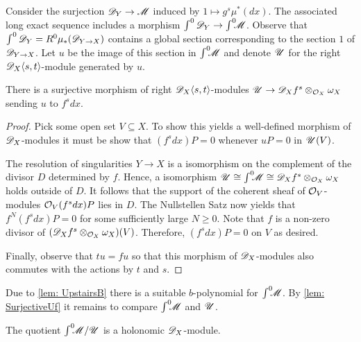 Consider the surjection $\mathscr{D}_Y\to \mathscr{M}$ induced by $1 \mapsto g^s \mu^*(dx)$.
The associated long exact sequence includes a morphism $\int^0\mathscr{D}_Y \to \int^0 \mkern -8mu\mathscr{M}$.
Observe that $\int^0\mathscr{D}_Y = R^0 \mu_*(\mathscr{D}_{Y\to X})$ contains a global section corresponding to the section $1$ of $\mathscr{D}_{Y\to X}$.
Let $u$ be the image of this section in $\int^0 \mkern -8mu\mathscr{M}$ and denote $\mathscr{U}$ for the right $\mathscr{D}_X\langle s,t\rangle$-module generated by $u$.
\begin{lemma}\label{lem: SurjectiveUf}
  There is a surjective morphism of right $\mathscr{D}_X\langle s,t\rangle$-modules $\mathscr{U} \to \mathscr{D}_X f^s \otimes_{\mathcal{O}_X} \omega_X$ sending $u$ to $f^s dx$.
\end{lemma}
\begin{proof}
  Pick some open set $V\subseteq X$. To show this yields a well-defined morphism of $\mathscr{D}_X$-modules it must be show that $(f^s dx)P = 0$ whenever $uP = 0$ in $\mathscr{U}(V)$.

  The resolution of singularities $Y\to X$ is a isomorphism on the complement of the divisor $D$ determined by $f$.
  Hence, a isomorphism $\mathscr{U} \cong \int^0 \mkern -8mu \mathscr{M} \cong  \mathscr{D}_X f^s  \otimes_{\mathcal{O}_X}\omega_X$ holds outside of $D$.
  It follows that the support of the coherent sheaf of $\mathcal{O}_V$-modules $\mathcal{O}_V (f^s dx) P $ lies in $D$.
  The Nullstellen Satz now yields that $f^N (f^s dx) P  = 0$ for some sufficiently large $N\geq 0$.
  Note that $f$ is a non-zero divisor of $(\mathscr{D}_Xf^s\otimes_{\mathcal{O}_X} \omega_X)(V)$.
  Therefore, $(f^s dx) P= 0$ on $V$ as desired.

  Finally, observe that $tu = fu$ so that this morphism of $\mathscr{D}_X$-modules also commutes with the actions by $t$ and $s$.
\end{proof}
Due to \cref{lem: UpstairsB} there is a suitable $b$-polynomial for $\int^0 \mkern -8mu \mathscr{M}$.
By \cref{lem: SurjectiveUf} it remains to compare $\int^0 \mkern -8mu\mathscr{M}$ and $\mathscr{U}$.
\begin{lemma}\label{lem: QuotientHolonomic}
  The quotient $\int^0 \mkern -8mu\mathscr{M} / \mathscr{U}$ is a holonomic $\mathscr{D}_X$-module.
\end{lemma}
